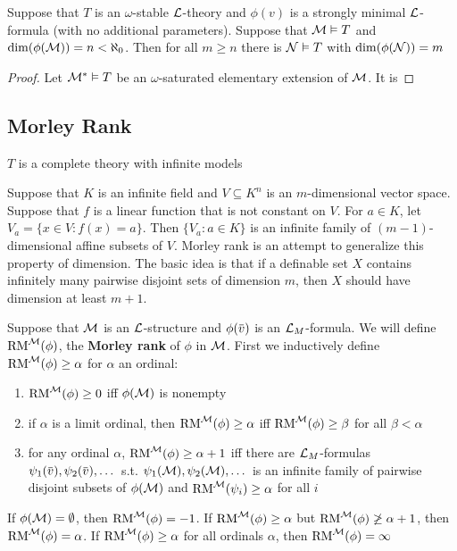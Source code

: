 \documentclass[11pt]{article}
\def \RM {\text{RM}}
\begin{document}
\begin{lemma}[]
Suppose that \(T\) is an \(\omega\)-stable \(\mathcal{L}\)-theory and \(\phi(v)\) is a strongly minimal \(\mathcal{L}\)-formula
(with no additional parameters). Suppose that \(\mathcal{M}\vDash T\) and \(\dim(\phi(\mathcal{M}))=n<\aleph_0\). Then for
all \(m\ge n\) there is \(\mathcal{N}\vDash T\) with \(\dim(\phi(\mathcal{N}))=m\)
\end{lemma}

\begin{proof}
Let \(\mathcal{M}^*\vDash T\)  be an \(\omega\)-saturated elementary extension of \(\mathcal{M}\). It is
\end{proof}

\subsection{Morley Rank}
\label{sec:orga3f8e88}
\(T\) is a complete theory with infinite models

Suppose that \(K\) is an infinite field and \(V\subseteq K^n\) is an \(m\)-dimensional vector space.
Suppose that \(f\) is a linear function that is not constant on \(V\). For \(a\in K\),
let \(V_a=\{x\in V:f(x)=a\}\). Then \(\{V_a:a\in K\}\) is an infinite family of \((m-1)\)-dimensional
affine subsets of \(V\). Morley rank is an attempt to generalize this property of dimension. The
basic idea is that if a definable set \(X\) contains infinitely many pairwise disjoint sets of
dimension \(m\), then \(X\) should have dimension at least \(m+1\).

\begin{definition}[]
Suppose that \(\mathcal{M}\) is an \(\mathcal{L}\)-structure and \(\phi(\barv)\) is an \(\mathcal{L}_M\)-formula. We will
define \(\RM^{\calm}(\phi)\), the \textbf{Morley rank} of \(\phi\) in \(\mathcal{M}\). First we inductively
define \(\RM^{\calm}(\phi)\ge\alpha\) for \(\alpha\) an ordinal:
\begin{enumerate}
\item \(\RM^{\calm}(\phi)\ge 0\) iff \(\phi(\mathcal{M})\) is nonempty
\item if \(\alpha\) is a limit ordinal, then \(\RM^{\calm}(\phi)\ge\alpha\) iff \(\RM^{\calm}(\phi)\ge\beta\) for all \(\beta<\alpha\)
\item for any ordinal \(\alpha\), \(\RM^{\calm}(\phi)\ge\alpha+1\) iff there
are \(\mathcal{L}_M\)-formulas \(\psi_1(\barv),\psi_2(\barv),\dots\) s.t. \(\psi_1(\mathcal{M}),\psi_2(\mathcal{M}),\dots\) is an infinite family
of pairwise disjoint subsets of \(\phi(\mathcal{M})\) and \(\RM^{\calm}(\psi_i)\ge\alpha\) for all \(i\)
\end{enumerate}


If \(\phi(\mathcal{M})=\emptyset\), then \(\RM^{\calm}(\phi)=-1\). If \(\RM^{\calm}(\phi)\ge\alpha\) but \(\RM^{\calm}(\phi)\not\ge\alpha+1\),
then \(\RM^{\calm}(\phi)=\alpha\). If \(\RM^{\calm}(\phi)\ge\alpha\) for all ordinals \(\alpha\), then \(\RM^{\calm}(\phi)=\infty\)
\end{definition}
\end{document}
